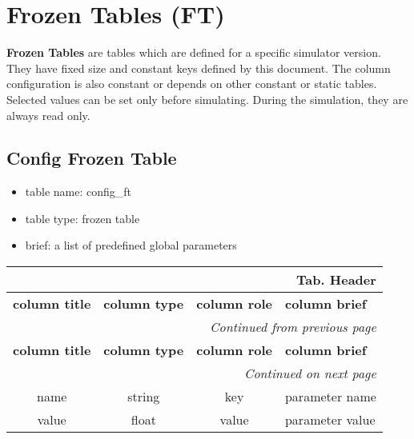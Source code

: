 \documentclass[a4paper,oneside,titlepage]{report}
\newcommand*{\LTHeaderIV}[5]{
  \multicolumn{4}{r}{\textbf{Tab. \thesubsection} \textbf{#1}}\\    
  \hline
  \textbf{#2} & \textbf{#3} & \textbf{#4} & \textbf{#5}\\
  \hline
  
  \endfirsthead
  \multicolumn{4}{r}{\textit{Continued from previous page}}\\    
  \hline
  \textbf{#2} & \textbf{#3} & \textbf{#4} & \textbf{#5}\\
  \hline
  \endhead
  \hline
  \multicolumn{4}{r}{\textit{Continued on next page}}\\
  \endfoot
  \hline
  \endlastfoot  
}
\begin{document}
\section{Frozen Tables (FT)}
\textbf{Frozen Tables} are tables which are defined for a specific simulator version. They have fixed size and constant keys defined by this document. The column configuration is also constant or depends on other constant or static tables. Selected values can be set only before simulating. During the simulation, they are always read only.

\subsection{Config Frozen Table}

\begin{itemize}
  \setlength{\itemsep}{0pt}
  \setlength{\parskip}{0pt}
\item table name: config\_ft  
\item table type: frozen table   
\item brief: a list of predefined global parameters   
\end{itemize}
\label{config_ft}

  \vspace{-0.5cm}
  \begin{longtable}{ |c|c|c|l| } 
    \LTHeaderIV{Header}{column title}{column type}{column role}{column brief} 
    name & string & key & parameter name\\
    value & float & value & parameter value\\
  \end{longtable}        
  
\end{document}

